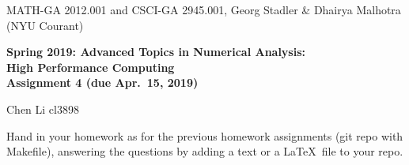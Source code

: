 \documentclass[12pt]{article}
\begin{document}
\begin{center}
  \vspace*{-2cm}
{\small MATH-GA 2012.001 and CSCI-GA 2945.001, Georg Stadler \&
  Dhairya Malhotra (NYU Courant)}
\end{center}
\vspace*{.5cm}
\begin{center}
\large \textbf{%
Spring 2019: Advanced Topics in Numerical Analysis: \\
High Performance Computing \\
Assignment 4 (due Apr.\ 15, 2019) }

Chen Li cl3898
\end{center}



 Hand in your homework as for
the previous homework assignments (git repo with Makefile), answering
the questions by adding a text or a \LaTeX\ file to your repo.
\\[.2ex]
\end{document}
